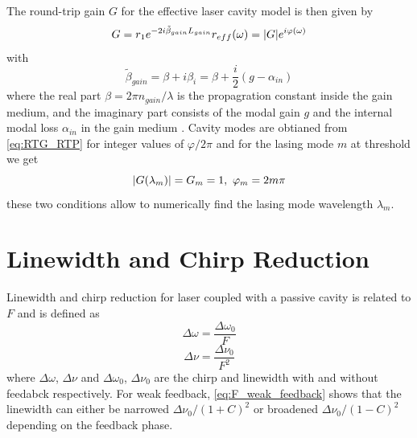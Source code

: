 The round-trip gain $G$ for the effective laser cavity model is then given by \cite{petermann2012laser, vallone2011enhanced}
\begin{equation}
    G=r_1e^{-2i\tilde{\beta}_{gain}L_{gain}}r_{eff}(\omega)=\abs{G}e^{i\varphi(\omega)}
    \label{eq:RTG_RTP}
\end{equation}
with \cite{coldren2012diode}
\begin{equation}
    \tilde{\beta}_{gain}=\beta+i\beta_{i}=\beta+\frac{i}{2}(g-\alpha_{in})
    \label{eq:beta_gain}
\end{equation}
where the real part $\beta=2\pi n_{gain}/\lambda$ is the propagration constant inside the gain medium, and the imaginary part consists of the modal gain $g$ and the internal modal loss $\alpha_{in}$ in the gain medium \cite{coldren2012diode}. Cavity modes are obtianed from \autoref{eq:RTG_RTP} for integer values of $\varphi/2\pi$ and for the lasing mode $m$ at threshold we get \cite{vallone2011enhanced}
\begin{equation}
    \abs{G(\lambda_m)}=G_m=1,\ \varphi_m=2m\pi
    \label{eq:lasing_condition}
\end{equation}
these two conditions allow to numerically find the lasing mode wavelength $\lambda_m$.

\section{Linewidth and Chirp Reduction}\label{sec:linewidth_and_chirp_reduction}
Linewidth and chirp reduction for laser coupled with a passive cavity is related to $F$ and is defined as \cite{kazarinov1987relation, petermann2012laser}
\begin{equation}
    \Delta\omega=\frac{\Delta\omega_0}{F}
    \label{eq:chirp_reduction}
\end{equation}
\begin{equation}
    \Delta\nu=\frac{\Delta\nu_0}{F^2}
    \label{eq:linewidth_reduction}
\end{equation}
where $\Delta\omega$, $\Delta\nu$ and $\Delta\omega_0$, $\Delta\nu_0$ are the chirp and linewidth with and without feedabck respectively. For weak feedback, \autoref{eq:F_weak_feedback} shows that the linewidth can either be narrowed $\Delta\nu_0/(1+C)^2$ or broadened $\Delta\nu_0/(1-C)^2$ depending on the feedback phase. 

